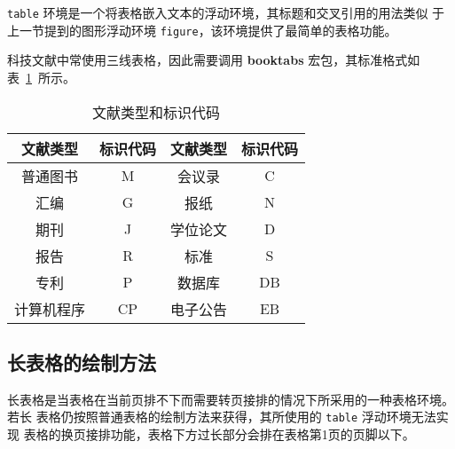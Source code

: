 \texttt{table} 环境是一个将表格嵌入文本的浮动环境，其标题和交叉引用的用法类似
于上一节提到的图形浮动环境 \texttt{figure}，该环境提供了最简单的表格功能。

科技文献中常使用三线表格，因此需要调用 \textbf{booktabs} 宏包，其标准格式如表~\ref{tab:booktabs}~所示。

\begin{table}[htbp]
\caption{文献类型和标识代码}
\label{tab:booktabs}
\centering
\begin{tabular}{cccc}
\toprule
文献类型 & 标识代码 & 文献类型 & 标识代码\\
\midrule
普通图书 & M &  会议录 & C\\
汇编 & G & 报纸 & N\\
期刊 & J & 学位论文 & D\\
报告 & R & 标准 & S\\
专利 & P & 数据库 & DB\\
计算机程序 & CP & 电子公告 & EB\\
\bottomrule
\end{tabular}
\end{table}

\subsection{长表格的绘制方法}

长表格是当表格在当前页排不下而需要转页接排的情况下所采用的一种表格环境。若长
表格仍按照普通表格的绘制方法来获得，其所使用的 \texttt{table} 浮动环境无法实现
表格的换页接排功能，表格下方过长部分会排在表格第1页的页脚以下。

